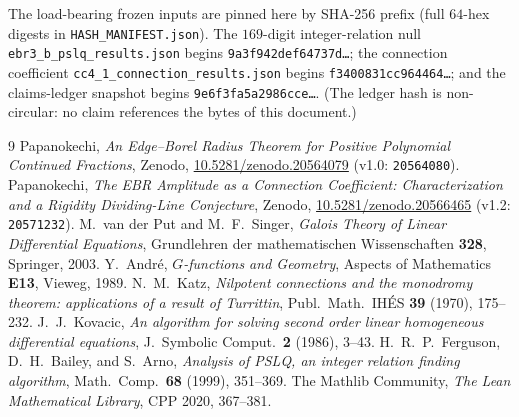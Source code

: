 \documentclass[11pt,reqno]{amsart}
\theoremstyle{plain}
\theoremstyle{definition}
\theoremstyle{remark}
\begin{document}
\medskip\noindent
The load-bearing frozen inputs are pinned here by SHA-256 prefix (full
$64$-hex digests in \texttt{HASH\_MANIFEST.json}). The $169$-digit
integer-relation null
\texttt{ebr3\_b\_pslq\_results.json} begins
\texttt{9a3f942def64737d{\dots}};
the connection coefficient
\texttt{cc4\_1\_connection\_results.json} begins
\texttt{f3400831cc964464{\dots}};
and the claims-ledger snapshot begins
\texttt{9e6f3fa5a2986cce{\dots}}.
(The ledger hash is non-circular: no claim references the bytes of this
document.)

\begin{thebibliography}{9}
 Papanokechi, \emph{An Edge--Borel Radius Theorem for Positive
Polynomial Continued Fractions}, Zenodo,
\href{https://doi.org/10.5281/zenodo.20564079}{10.5281/zenodo.20564079} (v1.0:
\texttt{20564080}).
 Papanokechi, \emph{The EBR Amplitude as a Connection
Coefficient: Characterization and a Rigidity Dividing-Line Conjecture},
Zenodo, \href{https://doi.org/10.5281/zenodo.20566465}{10.5281/zenodo.20566465}
(v1.2: \texttt{20571232}).
 M.~van der Put and M.~F.~Singer, \emph{Galois Theory of
Linear Differential Equations}, Grundlehren der mathematischen Wissenschaften
\textbf{328}, Springer, 2003.
 Y.~Andr\'e, \emph{$G$-functions and Geometry}, Aspects of
Mathematics \textbf{E13}, Vieweg, 1989.
 N.~M.~Katz, \emph{Nilpotent connections and the monodromy
theorem: applications of a result of Turrittin}, Publ.\ Math.\ IH\'ES
\textbf{39} (1970), 175--232.
 J.~J.~Kovacic, \emph{An algorithm for solving second order
linear homogeneous differential equations}, J.\ Symbolic Comput.\ \textbf{2}
(1986), 3--43.
 H.~R.~P.~Ferguson, D.~H.~Bailey, and S.~Arno, \emph{Analysis of
PSLQ, an integer relation finding algorithm}, Math.\ Comp.\ \textbf{68} (1999),
351--369.
 The Mathlib Community, \emph{The Lean Mathematical Library},
CPP 2020, 367--381.
\end{thebibliography}
\end{document}
